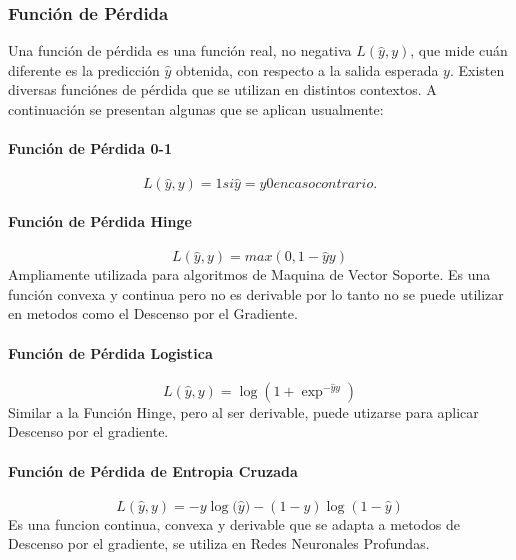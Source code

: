 \documentclass[a4paper,11pt,spanish]{book}
\begin{document}
	\subsubsection{Función de Pérdida}
	  Una función de pérdida es una función real, no negativa $L({\widehat y}, y)$, que mide cuán diferente es la predicción ${\widehat y}$ obtenida, con respecto a la
	  salida esperada $y$. Existen diversas funciónes de pérdida que se utilizan en distintos contextos. A continuación se presentan algunas que se aplican usualmente:
	  \paragraph{Función de Pérdida 0-1}
	    \begin{equation}
	      L({\widehat y}, y) =  1 si {\widehat y} = y 0 en caso contrario.
	    \end{equation}
	    
	  \paragraph{Función de Pérdida Hinge}
	    \begin{equation}
	      L({\widehat y}, y) =  max(0, 1 - {\widehat y}y)
	    \end{equation}
	    Ampliamente utilizada para algoritmos de Maquina de Vector Soporte. 
	    Es una función convexa y continua pero no es derivable por lo tanto no se puede utilizar en metodos como el Descenso por el Gradiente. 
	  \paragraph{Función de Pérdida Logistica} 
	    \begin{equation}
	      L({\widehat y}, y) =  {\log(1+ {\exp^{-{\widehat y}y}})}
	    \end{equation}
	    Similar a la Función Hinge, pero al ser derivable, puede utizarse para aplicar Descenso por el gradiente.
	  \paragraph{Función de Pérdida de Entropia Cruzada} 
	     \begin{equation}
	      L({\widehat y}, y) = -y{\log({\widehat y}}) - (1-y) {\log(1-{\widehat y})}
	     \end{equation}
	    Es una funcion continua, convexa y derivable que se adapta a metodos de Descenso por el gradiente, se utiliza en Redes Neuronales Profundas.
\end{document}
